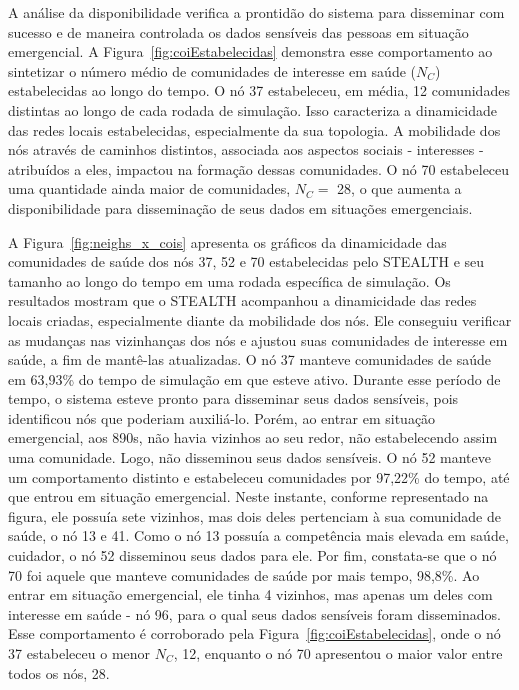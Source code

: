\documentclass[12pt]{article}
\begin{document}
A análise da disponibilidade verifica a prontidão do sistema para disseminar com sucesso e de maneira controlada os dados sensíveis das pessoas em situação emergencial. A Figura~\ref{fig:coiEstabelecidas} demonstra esse comportamento ao sintetizar o número médio de comunidades de interesse em saúde ($N_{C}$) estabelecidas ao longo do tempo. O nó 37 estabeleceu, em média, 12 comunidades distintas ao longo de cada rodada de simulação. Isso caracteriza a dinamicidade das redes locais estabelecidas, especialmente da sua topologia. A mobilidade dos nós através de caminhos dis\-tintos, associada aos aspectos sociais - interesses - atribuídos a eles, impactou na formação dessas comunidades. O nó 70 estabeleceu uma quantidade ainda maior de comunidades, $N_C=$ 28, o que aumenta a disponibilidade para disseminação de seus dados em situações emergenciais.

A Figura~\ref{fig:neighs_x_cois} apresenta os gráficos da dinamicidade das comunidades de saúde dos nós 37, 52 e 70 estabelecidas pelo \mbox{STEALTH} e seu tamanho ao longo do tempo em uma rodada específica de simulação. Os resultados mostram que o \mbox{STEALTH} acompanhou a dinamicidade das redes locais criadas, especialmente diante da mobilidade dos nós. Ele conseguiu verificar as mudanças nas vizinhanças dos nós e ajustou suas comunidades de interesse em saúde, a fim de mantê-las atualizadas. O nó 37 manteve comunidades de saúde em 63,93\% do tempo de simulação em que esteve ativo. Durante esse período de tempo, o sistema esteve pronto para disseminar seus dados sensíveis, pois identificou nós que poderiam auxiliá-lo. Porém, ao entrar em situação emergencial, aos 890s, não havia vizinhos ao seu redor, não estabelecendo assim uma comunidade. Logo, não disseminou seus dados sensíveis. O nó 52 manteve um comportamento distinto e estabeleceu comunidades por 97,22\% do tempo, até que entrou em situação emergencial. Neste instante, conforme representado na figura, ele possuía sete vizinhos, mas dois deles pertenciam à sua comunidade de saúde, o nó 13 e 41. Como o nó 13 possuía a competência mais elevada em saúde, cuidador, o nó 52 disseminou seus dados para ele. Por fim, constata-se que o nó 70 foi aquele que manteve comunidades de saúde por mais tempo, 98,8\%. Ao entrar em situação emergencial, ele tinha 4 vizinhos, mas apenas um deles com interesse em saúde - nó 96, para o qual seus dados sensíveis foram disseminados. Esse comportamento é corroborado pela Figura~\ref{fig:coiEstabelecidas}, onde o nó 37 estabeleceu o menor $N_C$, 12, enquanto o nó 70 apresentou o maior valor entre todos os nós, 28.
\end{document}
